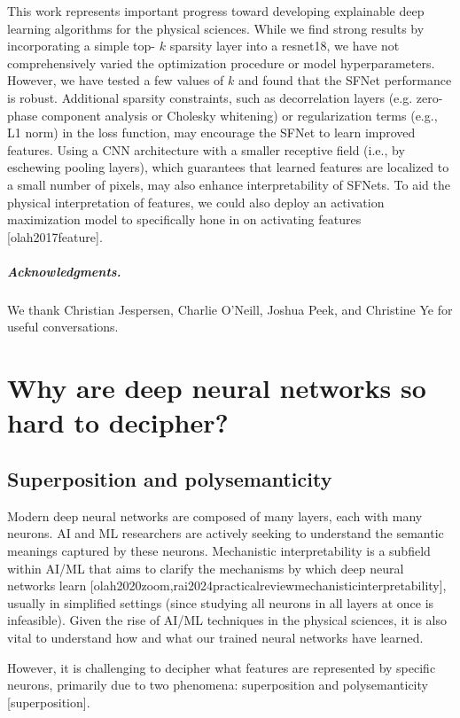 \documentclass[11pt,a4paper]{article}
\begin{document}
This work represents important progress toward developing explainable deep learning algorithms for the physical sciences. While we find strong results by incorporating a simple top- $k$  sparsity layer into a resnet18, we have not comprehensively varied the optimization procedure or model hyperparameters. However, we have tested a few values of  $k$  and found that the SFNet performance is robust. Additional sparsity constraints, such as decorrelation layers (e.g. zero-phase component analysis or Cholesky whitening) or regularization terms (e.g., L1 norm) in the loss function, may encourage the SFNet to learn improved features. Using a CNN architecture with a smaller receptive field (i.e., by eschewing pooling layers), which guarantees that learned features are localized to a small number of pixels, may also enhance interpretability of SFNets. To aid the physical interpretation of features, we could also deploy an activation maximization model to specifically hone in on activating features [olah2017feature].

\subparagraph{Acknowledgments.}

We thank Christian Jespersen, Charlie O'Neill, Joshua Peek, and Christine Ye for useful conversations.

\section{Why are deep neural networks so hard to decipher?}

\subsection{Superposition and polysemanticity}

Modern deep neural networks are composed of many layers, each with many neurons. AI and ML researchers are actively seeking to understand the semantic meanings captured by these neurons. Mechanistic interpretability is a subfield within AI/ML that aims to clarify the mechanisms by which deep neural networks learn [olah2020zoom,rai2024practicalreviewmechanisticinterpretability], usually in simplified settings (since studying all neurons in all layers at once is infeasible). Given the rise of AI/ML techniques in the physical sciences, it is also vital to understand how and what our trained neural networks have learned.

However, it is challenging to decipher what features are represented by specific neurons, primarily due to two phenomena: superposition and polysemanticity [superposition].
\end{document}
